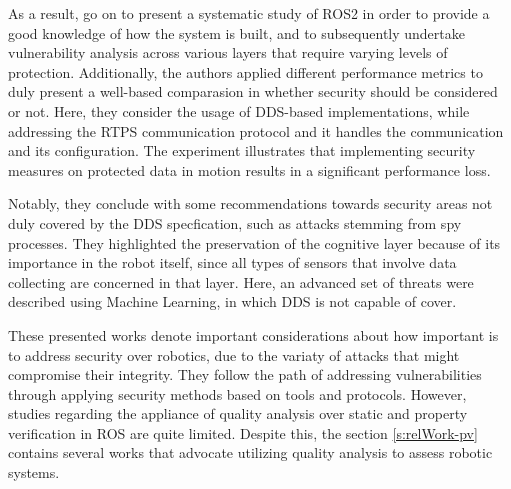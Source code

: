 As a result, \citeauthor{diluoffo2018robot} go on to present a systematic study of ROS2 in order to provide a good knowledge of how the system is built, and to subsequently undertake vulnerability analysis across various layers that require varying levels of protection. Additionally, the authors applied different performance metrics to duly present a well-based comparasion in whether security should be considered or not. Here, they consider the usage of DDS-based implementations, while addressing the RTPS communication protocol and it handles the communication and its configuration. The experiment illustrates that implementing security measures on protected data in motion results in a significant performance loss. 

Notably, they conclude with some recommendations towards security areas not duly covered by the DDS specfication, such as attacks stemming from
spy processes. They highlighted the preservation of the cognitive layer because of its importance in the robot itself, since all types of sensors that involve data collecting are concerned in that layer. Here, an advanced set of threats were described using Machine Learning, in which DDS is not capable of cover.

These presented works denote important considerations about how important is to address security over robotics, due to the variaty of attacks that might compromise their integrity. They follow the path of addressing vulnerabilities through applying security methods based on tools and protocols. However, studies regarding the appliance of quality analysis over static and property verification in ROS are quite limited. Despite this, the section \ref{s:relWork-pv} contains several works that advocate utilizing quality analysis to assess robotic systems.